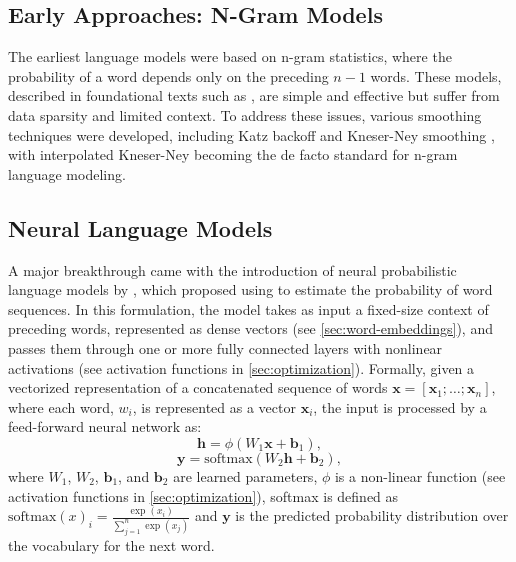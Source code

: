 \subsection{Early Approaches: N-Gram Models}
The earliest language models were based on n-gram statistics, where the probability of a word depends only on the preceding $n-1$ words. These models, described in foundational texts such as \cite{jurafsky2025speech}, are simple and effective but suffer from data sparsity and limited context. To address these issues, various smoothing techniques were developed, including Katz backoff \citep{katz2003estimation} and Kneser-Ney smoothing \citep{kneser1995improved}, with interpolated Kneser-Ney \citep{chen1999empirical} becoming the de facto standard for n-gram language modeling.

\subsection{Neural Language Models}
\label{sec:neural-language-models}

A major breakthrough came with the introduction of neural probabilistic language models by \cite{bengio2003neural}, which proposed using  to estimate the probability of word sequences. In this formulation, the model takes as input a fixed-size context of preceding words, represented as dense vectors (see \ref{sec:word-embeddings}), and passes them through one or more fully connected layers with nonlinear activations (see activation functions in \ref{sec:optimization}). Formally, given a vectorized representation of a concatenated sequence of words $\mathbf{x} = [\mathbf{x}_1; \dots; \mathbf{x}_n]$, where each word, $w_i$, is represented as a vector $\mathbf{x}_i$, the input is processed by a feed-forward neural network as:
\begin{equation}
\mathbf{h} = \phi(W_1 \mathbf{x} + \mathbf{b}_1),
\end{equation}
\begin{equation}
\mathbf{y} = \text{softmax}(W_2 \mathbf{h} + \mathbf{b}_2),
\end{equation}
where $W_1$, $W_2$, $\mathbf{b}_1$, and $\mathbf{b}_2$ are learned parameters, $\phi$ is a non-linear function (see activation functions in \ref{sec:optimization}), softmax is defined as $\text{softmax}(x)_i = \frac{\exp(x_i)}{\sum_{j=1}^n \exp(x_j)}$ and $\mathbf{y}$ is the predicted probability distribution over the vocabulary for the next word. 

